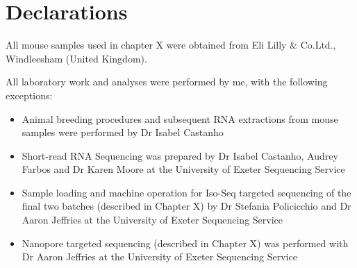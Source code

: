 \chapter*{Declarations}

All mouse samples used in chapter X were obtained from Eli Lilly \& Co.Ltd., Windleesham (United Kingdom). 

All laboratory work and analyses were performed by me, with the following exceptions:
\begin{itemize}
	\item Animal breeding procedures and subsequent RNA extractions from mouse samples were performed by Dr Isabel Castanho
	\item Short-read RNA Sequencing was prepared by Dr Isabel Castanho, Audrey Farbos and Dr Karen Moore at the University of Exeter Sequencing Service 
	\item Sample loading and machine operation for Iso-Seq targeted sequencing of the final two batches (described in Chapter X) by Dr Stefania Policicchio and Dr Aaron Jeffries at the University of Exeter Sequencing Service   
	\item Nanopore targeted sequencing (described in Chapter X) was performed with Dr Aaron Jeffries at the University of Exeter Sequencing Service 	
\end{itemize}